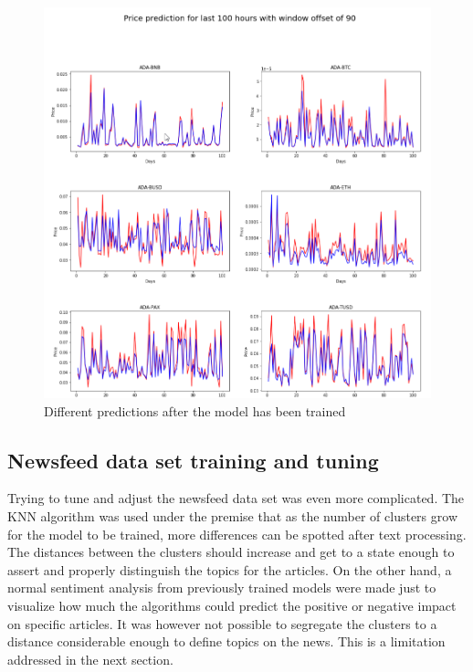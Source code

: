 \begin{figure}[H]
   \centering
   \includegraphics[width=\linewidth]{fig/MLCryptoChart.png}
    \caption{Different predictions after the model has been trained}
    \label{fig:MLCryptoChart}
\end{figure}

\subsection{Newsfeed data set training and tuning}

Trying to tune and adjust the newsfeed data set was even more complicated. The KNN algorithm was used under the premise that as the number of clusters grow for the model to be trained, more differences can be spotted after text processing. The distances between the clusters should increase and get to a state enough to assert and properly distinguish the topics for the articles. On the other hand, a normal sentiment analysis from previously trained models were made just to visualize how much the algorithms could predict the positive or negative impact on specific articles. It was however not possible to segregate the clusters to a distance considerable enough to define topics on the news. This is a limitation addressed in the next section.

